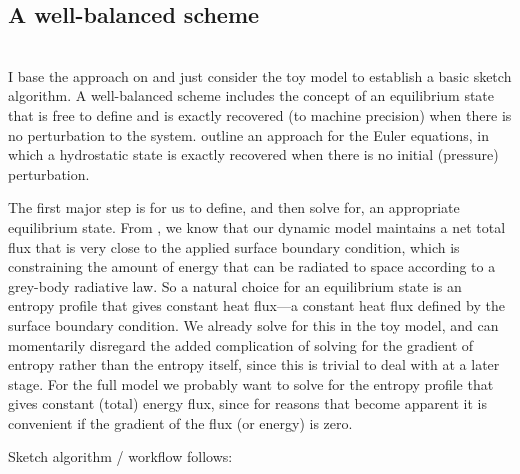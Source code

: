\subsection{A well-balanced scheme}

\\

I base the approach on \cite{GK19} and just consider the toy model to establish a basic sketch algorithm.  A well-balanced scheme includes the concept of an equilibrium state that is free to define and is exactly recovered (to machine precision) when there is no perturbation to the system.  \cite{GK19} outline an approach for the Euler equations, in which a hydrostatic state is exactly recovered when there is no initial (pressure) perturbation.

The first major step is for us to define, and then solve for, an appropriate equilibrium state.  From \cite{BSW18}, we know that our dynamic model maintains a net total flux that is very close to the applied surface boundary condition, which is constraining the amount of energy that can be radiated to space according to a grey-body radiative law.  So a natural choice for an equilibrium state is an entropy profile that gives constant heat flux---a constant heat flux defined by the surface boundary condition.  We already solve for this in the toy model, and can momentarily disregard the added complication of solving for the gradient of entropy rather than the entropy itself, since this is trivial to deal with at a later stage.  For the full model we probably want to solve for the entropy profile that gives constant (total) energy flux, since for reasons that become apparent it is convenient if the gradient of the flux (or energy) is zero.

Sketch algorithm / workflow follows:

